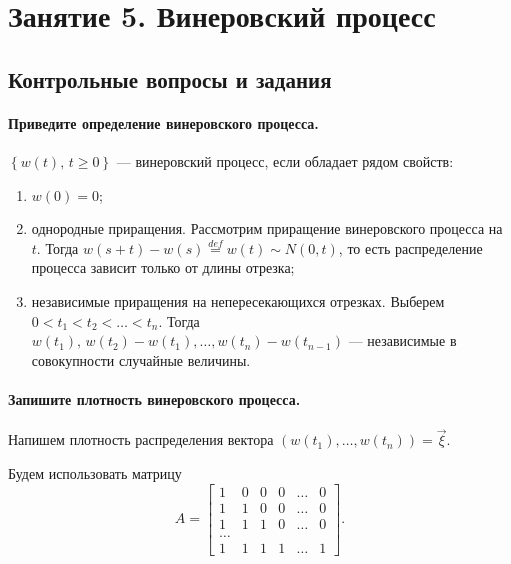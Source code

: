 \chapter*{Занятие 5. Винеровский процесс}

\section*{Контрольные вопросы и задания}

\subsubsection*{Приведите определение винеровского процесса.}

$ \left\{ w \left( t \right), \, t \geq 0 \right\} $ --- винеровский процесс,
если обладает рядом свойств:
\begin{enumerate}
  \item $w \left( 0 \right) = 0$;
  \item однородные приращения.
  Рассмотрим приращение винеровского процесса на $t$.
  Тогда
  $w \left( s + t \right) - w \left( s \right) \overset{def}{=}
    w \left( t \right) \sim
    N \left( 0, t \right) $, то есть распределение процесса зависит только от длины отрезка;
  \item независимые приращения на непересекающихся отрезках.
  Выберем $0 < t_1 < t_2 < \dotsc < t_n$.
  Тогда
  $w \left( t_1 \right), \,
    w \left( t_2 \right) - w \left( t_1 \right),
    \dotsc,
    w \left( t_n \right) - w \left( t_{n - 1} \right) $ ---
  независимые в совокупности случайные величины.
\end{enumerate}

\subsubsection*{Запишите плотность винеровского процесса.}

Напишем плотность распределения вектора
$ \left( w \left( t_1 \right), \dotsc, w \left( t_n \right) \right) =
  \vec{ \xi }$.

Будем использовать матрицу
$$A =
  \begin{bmatrix}
    1 & 0 & 0 & 0 & \dotsc & 0 \\
    1 & 1 & 0 & 0 & \dotsc & 0 \\
    1 & 1 & 1 & 0 & \dotsc & 0 \\
    \dotsc \\
    1 & 1 & 1 & 1 & \dotsc & 1
  \end{bmatrix}.$$

